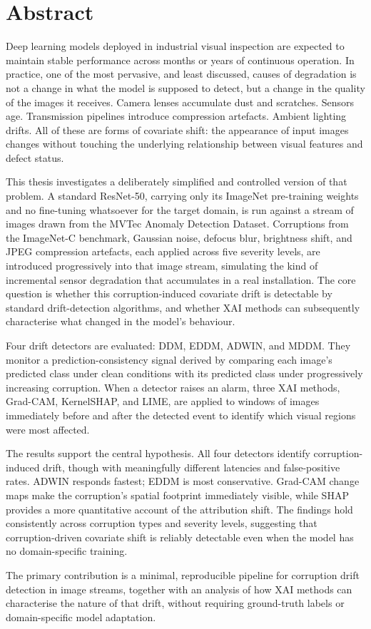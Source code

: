 
\chapter*{Abstract}

Deep learning models deployed in industrial visual inspection are expected to maintain stable performance across months or years of continuous operation. In practice, one of the most pervasive, and least discussed, causes of degradation is not a change in what the model is supposed to detect, but a change in the quality of the images it receives. Camera lenses accumulate dust and scratches. Sensors age. Transmission pipelines introduce compression artefacts. Ambient lighting drifts. All of these are forms of covariate shift: the appearance of input images changes without touching the underlying relationship between visual features and defect status.

This thesis investigates a deliberately simplified and controlled version of that problem. A standard ResNet-50, carrying only its ImageNet pre-training weights and no fine-tuning whatsoever for the target domain, is run against a stream of images drawn from the MVTec Anomaly Detection Dataset. Corruptions from the ImageNet-C benchmark, Gaussian noise, defocus blur, brightness shift, and JPEG compression artefacts, each applied across five severity levels, are introduced progressively into that image stream, simulating the kind of incremental sensor degradation that accumulates in a real installation. The core question is whether this corruption-induced covariate drift is detectable by standard drift-detection algorithms, and whether XAI methods can subsequently characterise what changed in the model's behaviour.

Four drift detectors are evaluated: DDM, EDDM, ADWIN, and MDDM. They monitor a prediction-consistency signal derived by comparing each image's predicted class under clean conditions with its predicted class under progressively increasing corruption. When a detector raises an alarm, three XAI methods, Grad-CAM, KernelSHAP, and LIME, are applied to windows of images immediately before and after the detected event to identify which visual regions were most affected.

The results support the central hypothesis. All four detectors identify corruption-induced drift, though with meaningfully different latencies and false-positive rates. ADWIN responds fastest; EDDM is most conservative. Grad-CAM change maps make the corruption's spatial footprint immediately visible, while SHAP provides a more quantitative account of the attribution shift. The findings hold consistently across corruption types and severity levels, suggesting that corruption-driven covariate shift is reliably detectable even when the model has no domain-specific training.

The primary contribution is a minimal, reproducible pipeline for corruption drift detection in image streams, together with an analysis of how XAI methods can characterise the nature of that drift, without requiring ground-truth labels or domain-specific model adaptation.
